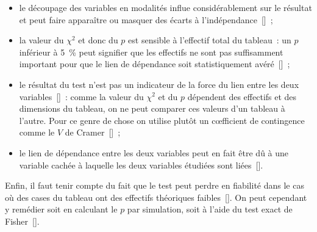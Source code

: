\documentclass[a4paper,10pt,twoside,francais]{report}
\newcommand{\chid}{$\chi^2$\xspace}
\begin{document}
\begin{itemize}
\item le découpage des variables en modalités influe considérablement
  sur le résultat et peut faire apparaître ou masquer des écarts à
  l'indépendance~[\pageref{ssec-modal}]~;
\item la valeur du \chid et donc du $p$ est sensible à l'effectif
  total du tableau~: un $p$ inférieur à 5~\% peut signifier que les
  effectifs ne sont pas suffisamment important pour que le lien de
  dépendance soit statistiquement avéré~[\pageref{ssec-depeff}]~;
\item le résultat du test n'est pas un indicateur de la force du lien
  entre les deux variables~[\pageref{sec-intdep}]~: comme la valeur du
  \chid et du $p$ dépendent des effectifs et des dimensions du
  tableau, on ne peut comparer ces valeurs d'un tableau à
  l'autre. Pour ce genre de chose on utilise plutôt un c\oe{}fficient
  de contingence comme le $V$ de Cramer~[\pageref{sec-vcramer}]~;
\item le lien de dépendance entre les deux variables peut en fait être
  dû à une variable cachée à laquelle les deux variables étudiées sont
  liées~[\pageref{ssec-varcachee}].
\end{itemize}

Enfin, il faut tenir compte du fait que le test peut perdre en
fiabilité dans le cas où des cases du tableau ont des effectifs
théoriques faibles~[\pageref{ssec-efffaibles}]. On peut cependant y
remédier soit en calculant le $p$ par simulation, soit à l'aide du test
exact de Fisher~[\pageref{ssec-testfisher}].




\end{document}
